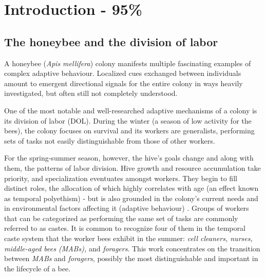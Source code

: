 
\chapter{Introduction - 95\%}  %

\ifpdf
    \graphicspath{{Chapters/Chapter1/Figs/Raster/}{Chapters/Chapter1/Figs/PDF/}{Chapters/Chapter1/Figs/}}
\else
    \graphicspath{{Chapters/Chapter1/Figs/Vector/}{Chapters/Chapter1/Figs/}}
\fi


\section{The honeybee and the division of labor} %
A honeybee (\textit{Apis mellifera}) colony manifests multiple fascinating examples of complex adaptive behaviour. 
Localized cues exchanged between individuals amount to emergent directional signals for the entire colony 
in ways heavily investigated, but often still not completely understood. 

One of the most notable and well-researched adaptive mechanisms of a colony is its division of labor (DOL). 
During the winter (a season of low activity for the bees), the colony focuses on survival 
and its workers are generalists, performing sets of tasks not easily distinguishable from those of other workers. 

For the spring-summer season, however, the hive’s goals change and along with them, the patterns of labor division. 
Hive growth and resource accumulation take priority, and specialization eventuates amongst workers. 
They begin to fill distinct roles, the allocation of which highly correlates with age (an effect 
known as temporal polyethism) - but is also grounded in the colony’s current needs and in environmental 
factors affecting it (adaptive behaviour) \citep{seeley_adaptive_1982}. Groups of workers that can be 
categorized as performing the same set of tasks are commonly referred to as castes. It is common to recognize 
four of them in the temporal caste system that the worker bees exhibit in the summer:
\textit{cell cleaners, nurses, middle-aged bees (MABs),} and \textit{foragers}. 
This work concentrates on the transition between \textit{MABs} and \textit{foragers}, 
possibly the most distinguishable and important in the lifecycle of a bee.


